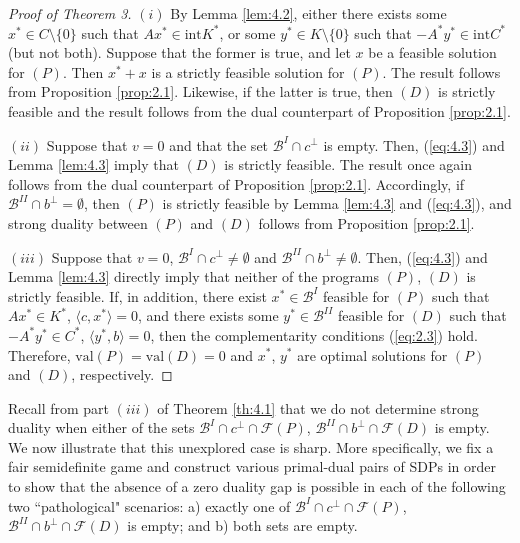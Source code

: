 \documentclass[11pt, twoside]{article}
\numberwithin{equation}{section}
\theoremstyle{definition}
\begin{document}
\begin{proof}[Proof of Theorem 3]
$(i)$ By Lemma \ref{lem:4.2}, either there exists some $x^*\in C\setminus\{0\}$ such that $Ax^*\in \text{int}K^*$, or some $y^*\in K\setminus\{0\}$ such that $-A^*y^*\in \text{int}C^*$ (but not both). Suppose that the former is true, and let $x$ be a feasible solution for \hyperlink{primal}{$(P)$}. Then $x^*+x$ is a strictly feasible solution for \hyperlink{primal}{$(P)$}. The result follows from Proposition \ref{prop:2.1}. Likewise, if the latter is true, then \hyperlink{dual}{$(D)$} is strictly feasible and the result follows from the dual counterpart of Proposition \ref{prop:2.1}.\par
$(ii)$ Suppose that $v=0$ and that the set $\mathcal{B}^{I}\cap c^{\perp}$ is empty. Then, (\ref{eq:4.3}) and Lemma \ref{lem:4.3} imply that \hyperlink{dual}{$(D)$} is strictly feasible. The result once again follows from the dual counterpart of Proposition \ref{prop:2.1}. Accordingly, if $\mathcal{B}^{II}\cap b^{\perp}=\emptyset$, then \hyperlink{primal}{$(P)$} is strictly feasible by Lemma \ref{lem:4.3} and (\ref{eq:4.3}), and strong duality between \hyperlink{primal}{$(P)$} and \hyperlink{dual}{$(D)$} follows from Proposition \ref{prop:2.1}.\par
$(iii)$ Suppose that $v=0$, $\mathcal{B}^{I}\cap c^{\perp}\neq\emptyset$ and $\mathcal{B}^{II}\cap b^{\perp}\neq\emptyset$. Then, (\ref{eq:4.3}) and Lemma \ref{lem:4.3} directly imply that neither of the programs \hyperlink{primal}{$(P)$}, \hyperlink{dual}{$(D)$} is strictly feasible. If, in addition, there exist $x^*\in\mathcal{B}^{I}$ feasible for \hyperlink{primal}{$(P)$} such that $Ax^*\in K^*$, $\langle c,x^*\rangle=0$, and there exists some $y^*\in\mathcal{B}^{II}$ feasible for \hyperlink{dual}{$(D)$} such that $-A^*y^*\in C^*$, $\langle y^*,b\rangle=0$, then the complementarity conditions (\ref{eq:2.3}) hold. Therefore, $\text{val}(P)=\text{val}(D)=0$ and $x^*$, $y^*$ are optimal solutions for \hyperlink{primal}{$(P)$} and \hyperlink{dual}{$(D)$}, respectively.
\end{proof}

 Recall from part $(iii)$ of Theorem \ref{th:4.1} that we do not determine strong duality when either of the sets $\mathcal{B}^{I}\cap c^{\perp}\cap\mathcal{F}(P)$, $\mathcal{B}^{II}\cap b^{\perp}\cap\mathcal{F}(D)$ is empty. We now illustrate that this unexplored case is sharp. More specifically, we fix a fair semidefinite game and construct various primal-dual pairs of SDPs in order to show that the absence of a zero duality gap is possible in each of the following two ``pathological" scenarios: a) exactly one of $\mathcal{B}^{I}\cap c^{\perp}\cap\mathcal{F}(P)$, $\mathcal{B}^{II}\cap b^{\perp}\cap\mathcal{F}(D)$ is empty; and b) both sets are empty.
\end{document}
